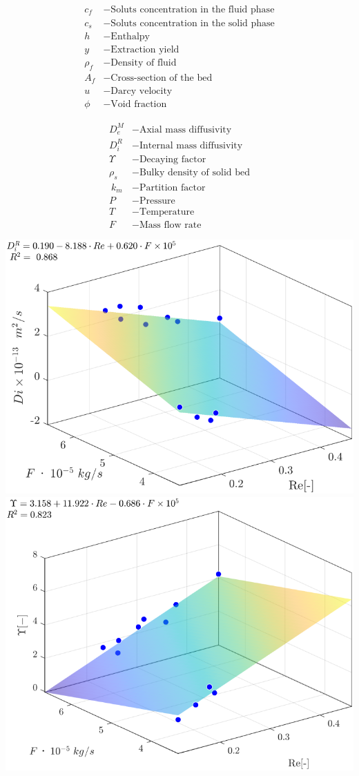 \documentclass[a0,portrait]{a0poster}
\begin{document}
\begin{multicols}{2}
\begin{tcolorbox}[width=\linewidth, boxrule=0mm, sharp corners=all, colback=white]
\begin{minipage}[h!]{0.5\linewidth}
	\begin{align*}
		c_f &- \text{Soluts concentration in the fluid phase}\\
		c_s &- \text{Soluts concentration in the solid phase}\\
		h~  &- \text{Enthalpy}\\
		y~ &- \text{Extraction yield}\\
		\rho_f &- \text{Density of fluid}\\
		A_f &- \text{Cross-section of the bed}\\
		u~~ &- \text{Darcy velocity}\\
		\phi~~ &- \text{Void fraction}
	\end{align*}
\end{minipage}
%
\begin{minipage}[h!]{0.5\linewidth}
	\begin{align*}
		D_e^M &- \text{Axial mass diffusivity}\\
		D_i^R &- \text{Internal mass diffusivity}\\
		\Upsilon~~ &- \text{Decaying factor}\\
		\rho_s~ &- \text{Bulky density of solid bed}\\
		~k_m &- \text{Partition factor}\\
		P~~ &- \text{Pressure}\\
		T~~ &- \text{Temperature}\\
		F~~ &- \text{Mass flow rate}
	\end{align*}
\end{minipage}

\begin{center}%
	\includegraphics[width=0.49\linewidth]{Di_Re_F_1.png}
	\includegraphics[width=0.49\linewidth]{Gamma_Re_F_1.png}
\end{center}%


\end{tcolorbox}
\end{multicols}
\end{document}
